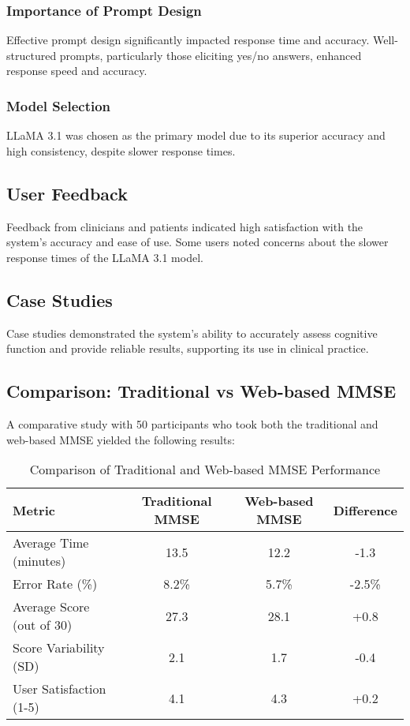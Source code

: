\subsubsection{Importance of Prompt Design}
Effective prompt design significantly impacted response time and accuracy. Well-structured prompts, particularly those eliciting yes/no answers, enhanced response speed and accuracy.

\subsubsection{Model Selection}
LLaMA 3.1 was chosen as the primary model due to its superior accuracy and high consistency, despite slower response times.

\subsection{User Feedback}
Feedback from clinicians and patients indicated high satisfaction with the system's accuracy and ease of use. Some users noted concerns about the slower response times of the LLaMA 3.1 model.

\subsection{Case Studies}
Case studies demonstrated the system's ability to accurately assess cognitive function and provide reliable results, supporting its use in clinical practice.

\subsection{Comparison: Traditional vs Web-based MMSE}
A comparative study with 50 participants who took both the traditional and web-based MMSE yielded the following results:

\begin{table}[h]
\centering
\begin{tabular}{|l|c|c|c|}
\hline
\textbf{Metric} & \textbf{Traditional MMSE} & \textbf{Web-based MMSE} & \textbf{Difference} \\
\hline
Average Time (minutes) & 13.5 & 12.2 & -1.3 \\
Error Rate (\%) & 8.2\% & 5.7\% & -2.5\% \\
Average Score (out of 30) & 27.3 & 28.1 & +0.8 \\
Score Variability (SD) & 2.1 & 1.7 & -0.4 \\
User Satisfaction (1-5) & 4.1 & 4.3 & +0.2 \\
\hline
\end{tabular}
\caption{Comparison of Traditional and Web-based MMSE Performance}
\label{tab:mmse_comparison}
\end{table}

